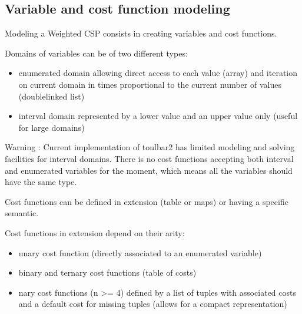 \documentclass[letterpaper,10pt,openany,oneside,english]{sphinxmanual}
\begin{document}
\subsection{Variable and cost function modeling}
\label{\detokenize{ref/ref_modules:variable-and-cost-function-modeling}}

\begin{fulllineitems}

\pysigstartsignatures
{}
\pysigstopsignatures
\sphinxAtStartPar

\sphinxAtStartPar
Modeling a Weighted CSP consists in creating variables and cost functions.

\sphinxAtStartPar
Domains of variables can be of two different types:
\begin{itemize}
\item {} 
\sphinxAtStartPar
enumerated domain allowing direct access to each value (array) and iteration on current domain in times proportional to the current number of values (double\sphinxhyphen{}linked list)

\item {} 
\sphinxAtStartPar
interval domain represented by a lower value and an upper value only (useful for large domains)

\end{itemize}

Warning : Current implementation of toulbar2 has limited modeling and solving facilities for interval domains. There is no cost functions accepting both interval and enumerated variables for the moment, which means all the variables should have the same type.

\sphinxAtStartPar

\sphinxAtStartPar
Cost functions can be defined in extension (table or maps) or having a specific semantic.

\sphinxAtStartPar
Cost functions in extension depend on their arity:
\begin{itemize}
\item {} 
\sphinxAtStartPar
unary cost function (directly associated to an enumerated variable)

\item {} 
\sphinxAtStartPar
binary and ternary cost functions (table of costs)

\item {} 
\sphinxAtStartPar
n\sphinxhyphen{}ary cost functions (n \textgreater{}= 4) defined by a list of tuples with associated costs and a default cost for missing tuples (allows for a compact representation)


\end{itemize}
\end{fulllineitems}
\end{document}
